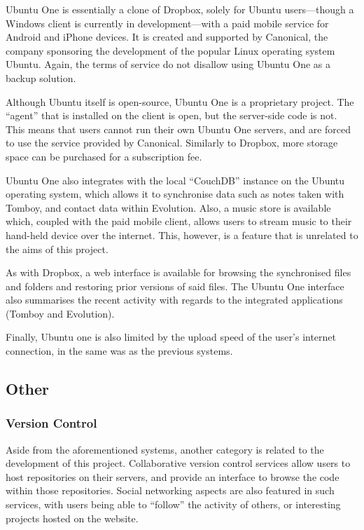 \begin{bibunit}[plain]
Ubuntu One is essentially a clone of Dropbox, solely for Ubuntu users---though
a Windows client is currently in development---with a paid mobile service for
Android and iPhone devices\cite{UbuntuOne}. It is created and supported by
Canonical, the company sponsoring the development of the popular Linux
operating system Ubuntu\cite{UbuntuOne}. Again, the terms of service do not
disallow using Ubuntu One as a backup solution\cite{UbuntuOne-terms}.

Although Ubuntu itself is open-source, Ubuntu One is a proprietary project. The
``agent'' that is installed on the client is open, but the server-side code is
not\cite{UbuntuOne-servers}. This means that users cannot run their own Ubuntu
One servers, and are forced to use the service provided by Canonical. Similarly
to Dropbox, more storage space can be purchased for a subscription
fee\cite{UbuntuOne}.

Ubuntu One also integrates with the local ``CouchDB'' instance on the Ubuntu
operating system, which allows it to synchronise data such as notes taken with
Tomboy, and contact data within Evolution\cite{UbuntuOne-couchdb}. Also,
a music store is available which, coupled with the paid mobile client, allows
users to stream music to their hand-held device over the
internet\cite{UbuntuOne}. This, however, is a feature that is unrelated to the
aims of this project.

As with Dropbox, a web interface is available for browsing the synchronised
files and folders and restoring prior versions of said files. The Ubuntu One
interface also summarises the recent activity with regards to the integrated
applications (Tomboy and Evolution)\cite{UbuntuOne}.

Finally, Ubuntu one is also limited by the upload speed of the user's internet
connection, in the same was as the previous systems.

\subsection{Other}

\subsubsection{Version Control}

Aside from the aforementioned systems, another category is related to the
development of this project. Collaborative version control services allow users
to host repositories on their servers, and provide an interface to browse the
code within those repositories. Social networking aspects are also featured in
such services, with users being able to ``follow'' the activity of others, or
interesting projects hosted on the website.


\end{bibunit}
